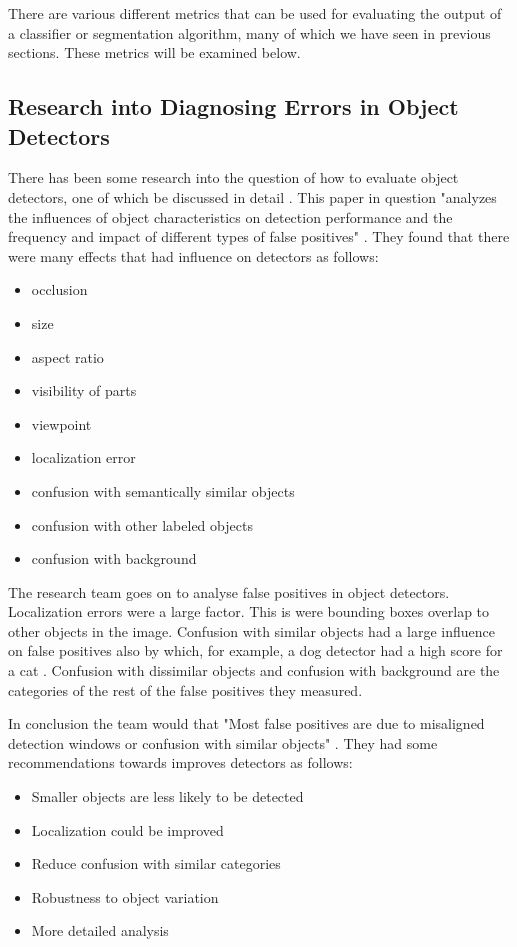 There are various different metrics that can be used for evaluating the output
of a classifier or segmentation algorithm, many of which we have seen in previous
sections. These metrics will be examined below.

\subsection*{Research into Diagnosing Errors in Object Detectors}
There has been some research into the question of how to evaluate object
detectors, one of which be discussed in detail \parencite{diagnosingErrors}.
This paper in question "analyzes the influences of object characteristics on
detection performance and the frequency and impact of different types of false
positives" \parencite{diagnosingErrors}. They found that there were many effects
that had influence on detectors as follows:
\begin{itemize}
    \item{occlusion}
    \item{size}
    \item{aspect ratio}
    \item{visibility of parts}
    \item{viewpoint}
    \item{localization error}
    \item{confusion with semantically similar objects}
    \item{confusion with other labeled objects}
    \item{confusion with background}
\end{itemize}

The research team goes on to analyse false positives in object detectors.
Localization errors were a large factor. This is were bounding boxes overlap to
other objects in the image. Confusion with similar objects had a large influence
on false positives also by which, for example, a dog detector had a high score
for a cat \parencite{diagnosingErrors}. Confusion with dissimilar objects and
confusion with background are the categories of the rest of the false positives
they measured.

In conclusion the team would that "Most false positives are due to misaligned
detection windows or confusion with similar objects"
\parencite{diagnosingErrors}. They had some recommendations towards improves
detectors as follows:
\begin{itemize}
	\item{Smaller objects are less likely to be detected}
	\item{Localization could be improved}
	\item{Reduce confusion with similar categories}
	\item{Robustness to object variation}
	\item{More detailed analysis}
\end{itemize}

